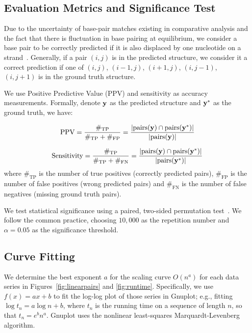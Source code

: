 \subsection{Evaluation Metrics and Significance Test}

Due to the uncertainty of base-pair matches existing in comparative analysis
and the fact that there is fluctuation in base pairing at equilibrium,
we consider a base pair to be correctly predicted if it is also displaced by one
nucleotide on a strand~\cite{mathews+:1999}.
Generally, if a pair $(i,j)$ is in the predicted structure, we consider it a
correct prediction if one of $(i,j)$, $(i-1,j)$, $(i+1,j)$, $(i,j-1)$, $(i,j+1)$ is in the
ground truth structure.

We use Positive Predictive Value (PPV)
and sensitivity 
as accuracy measurements. 
Formally, denote $\mathbf{y}$ as the predicted structure and $\mathbf{y}^{*}$ as the ground
truth, we have:

$$\text{PPV} = \frac{\#_{\text {TP}}}{\#_{\text {TP}} + \#_{\text {FP}}}  = 
\frac{|\text{pairs}(\mathbf{y}) \cap \text{pairs}(\mathbf{y}^*)|}{|\text{pairs}(\mathbf{y})|} $$

$$ \text{Sensitivity} = \frac{\#_{\text {TP}}}{\#_{\text {TP}} + \#_{\text {FN}}}  =
\frac{|\text{pairs}(\mathbf{y}) \cap \text{pairs}(\mathbf{y}^*)|}{|\text{pairs}(\mathbf{y}^*)|}$$
where $\#_{\text {TP}}$ is the number of true positives (correctly predicted pairs),
$\#_{\text {FP}}$ is the number of false positives (wrong predicted pairs)
and $\#_{\text {FN}}$ is the number of false negatives (missing ground truth pairs).

We test statistical significance using a paired, two-sided permutation test~\cite{Aghaeepour+Hoos:2013}.
We follow the common practice, choosing $10,000$ as the repetition number
and $\alpha=0.05$ as the significance threshold.

\subsection{Curve Fitting}
We determine the best exponent $a$ for the scaling curve $O(n^a)$ for each data series in Figures~\ref{fig:linearpairs} and \ref{fig:runtime}.
Specifically, we use $f(x) = a x + b$ to fit the log-log plot of those series in Gnuplot;
e.g., fitting $\log t_n = a \log n + b$, where $t_n$ is the running time on a sequence of length $n$,
so that $t_n = e^b n^a$.
Gnuplot uses the nonlinear least-squares Marquardt-Levenberg algorithm.


